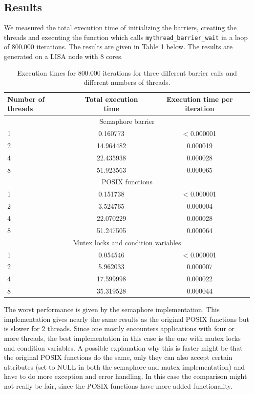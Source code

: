 \documentclass[11pt,a4paper,onecolumn]{article}
\begin{document}
\subsection{Results}
We measured the total execution time of initializing the barriers, creating the threads and executing the function which calls \texttt{mythread\_barrier\_wait} in a loop of 800.000 iterations. The results are given in Table \ref{tab:barrier} below. The results are generated on a LISA node with 8 cores.

\begin{table}[H]
  \centering
  \begin{tabular}{l | c | c}
  Number of threads  & Total execution time & Execution time per iteration \\
  \hline
  \multicolumn{3}{c}{Semaphore barrier}\\
  \hline
  1 & 0.160773 & < 0.000001 \\
  2 & 14.964482 & 0.000019 \\
  4 & 22.435938 & 0.000028 \\
  8 & 51.923563 & 0.000065 \\
  \hline
  \multicolumn{3}{c}{POSIX functions} \\
  \hline
  1 & 0.151738 & < 0.000001 \\
  2 & 3.524765 & 0.000004 \\
  4 & 22.070229 & 0.000028 \\
  8 & 51.247505 & 0.000064 \\
  \hline
  \multicolumn{3}{c}{Mutex locks and condition variables} \\
  \hline
  1 & 0.054546 & < 0.000001 \\
  2 & 5.962033 & 0.000007 \\
  4 & 17.599998 & 0.000022 \\
  8 & 35.319528 & 0.000044 \\
  \end{tabular}
  \caption{Execution times for 800.000 iterations for three different barrier calls and different numbers of threads.}
  \label{tab:barrier}
\end{table}

The worst performance is given by the semaphore implementation. This implementation gives nearly the same results as the original POSIX functions but is slower for 2 threads. Since one mostly encounters applications with four or more threads, the best implementation in this case is the one with mutex locks and condition variables. A possible explanation why this is faster might be that the original POSIX functions do the same, only they can also accept certain attributes (set to NULL in both the semaphore and mutex implementation) and have to do more exception and error handling. In this case the comparison might not really be fair, since the POSIX functions have more added functionality.
\end{document}
